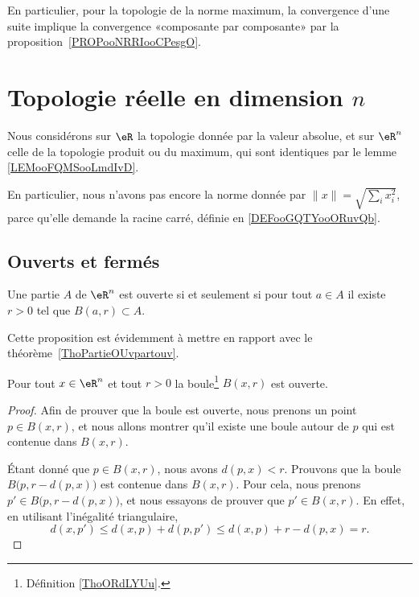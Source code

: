 \begin{normaltext}
    En particulier, pour la topologie de la norme maximum, la convergence d'une suite implique la convergence «composante par composante» par la proposition~\ref{PROPooNRRIooCPesgO}.
\end{normaltext}


\section{Topologie réelle en dimension $n$}

Nous considérons sur \( \eR\) la topologie donnée par la valeur absolue, et sur \( \eR^n\) celle de la topologie produit ou du maximum, qui sont identiques par le lemme \ref{LEMooFQMSooLmdIvD}.

En particulier, nous n'avons pas encore la norme donnée par \( \| x \|=\sqrt{ \sum_ix_i^2 }\), parce qu'elle demande la racine carré, définie en \ref{DEFooGQTYooORuvQb}.

\subsection{Ouverts et fermés}

\begin{proposition}\label{PROPooEQYJooBbPiAj}
    Une partie \( A\) de \( \eR^n\) est ouverte si et seulement si pour tout \( a\in A\) il existe \( r>0\) tel que \( B(a,r)\subset A\).
\end{proposition}
Cette proposition est évidemment à mettre en rapport avec le théorème~\ref{ThoPartieOUvpartouv}.

\begin{lemma}   \label{LemMESSExh}
    Pour tout $x \in \eR^n$ et tout $r >0$ la boule\footnote{Définition \ref{ThoORdLYUu}.} \( B(x,r)\) est ouverte.
\end{lemma}

\begin{proof}
    Afin de prouver que la boule est ouverte, nous prenons un point $p\in B(x,r)$, et nous allons montrer qu'il existe une boule autour de $p$ qui est contenue dans $B(x,r)$.

    Étant donné que $p\in B(x,r)$, nous avons $d(p,x)<r$. Prouvons que la boule $B\big(p,r-d(p,x)\big)$ est contenue dans $B(x,r)$. Pour cela, nous prenons $p'\in B\big(p,r-d(p,x)\big)$, et nous essayons de prouver que $p'\in B(x,r)$. En effet, en utilisant l'inégalité triangulaire,
    \begin{equation}
	    d(x,p')\leq d(x,p)+d(p,p')\leq d(x,p)+r-d(p,x)=r.
    \end{equation}
\end{proof}


